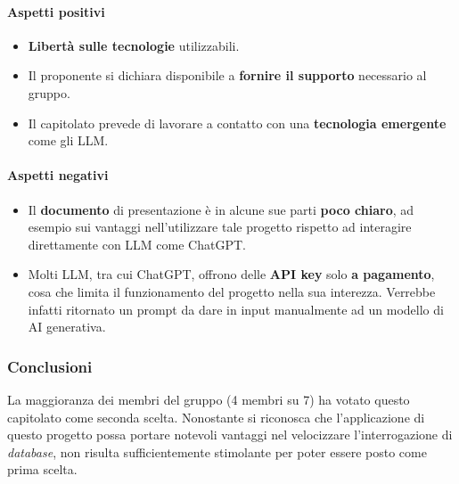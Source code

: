 \documentclass[italian,12pt]{article} %
\begin{document}
\paragraph{Aspetti positivi}
\begin{itemize}
	\item \textbf{Libertà sulle tecnologie} utilizzabili.
	\item Il proponente si dichiara disponibile a \textbf{fornire il supporto} necessario al gruppo.
	\item Il capitolato prevede di lavorare a contatto con una \textbf{tecnologia emergente} come gli LLM.
\end{itemize}

\paragraph{Aspetti negativi}
\begin{itemize}
	\item Il \textbf{documento} di presentazione è in alcune sue parti \textbf{poco chiaro}, ad esempio sui vantaggi nell'utilizzare tale progetto rispetto ad interagire
	      direttamente con LLM come ChatGPT.
	\item Molti LLM, tra cui ChatGPT, offrono delle \textbf{API key} solo \textbf{a pagamento}, cosa che limita il funzionamento del progetto nella
	      sua interezza. Verrebbe infatti ritornato un prompt da dare in input manualmente ad un modello di AI generativa.

\end{itemize}

\subsubsection{Conclusioni}
La maggioranza dei membri del gruppo (4 membri su 7) ha votato questo capitolato come seconda scelta. Nonostante si riconosca
che l'applicazione di questo progetto possa portare notevoli vantaggi nel velocizzare l'interrogazione di \textit{database},
non risulta sufficientemente stimolante per poter essere posto come prima scelta.
\end{document}
